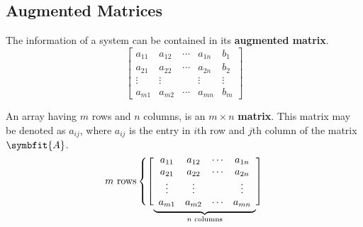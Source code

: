 \documentclass{article}
\begin{document}
	\subsection{Augmented Matrices}
	\begin{definition}
		The information of a system can be contained in its \textbf{augmented matrix}.
		\begin{equation*}
			\left[\begin{array}{cccc|c}
				a_{11} & a_{12} & \cdots & a_{1n} & b_1 \\
				a_{21} & a_{22} & \cdots & a_{2n} & b_2 \\
				\vdots & \vdots &        & \vdots & \vdots \\
				a_{m1} & a_{m2} & \cdots & a_{mn} & b_m
			\end{array}\right]
		\end{equation*}
	\end{definition}
	\begin{definition}
		An array having $m$ rows and $n$ columns, is an $m \times n$ \textbf{matrix}. This matrix may be denoted as $a_{ij}$, where $a_{ij}$ is the entry in $i$th row and $j$th column of the matrix $\symbfit{A}$.
		\begin{equation*}
			\text{$m$ rows} 
			\left\{
				\left[
					\vphantom{\begin{array}{c} 1 \\ 1 \\ 1 \\ 1 \end{array}}
					\smash{\underbrace{
						\begin{array}{cccc}
							a_{11} & a_{12} & \cdots & a_{1n} \\
							a_{21} & a_{22} & \cdots & a_{2n} \\
							\vdots & \vdots &        & \vdots \\
							a_{m1} & a_{m2} & \cdots & a_{mn}
						\end{array}
					}_{\text{$n$ columns}}}
				\right]
			\right.
		\end{equation*}
	\end{definition}
\end{document}
